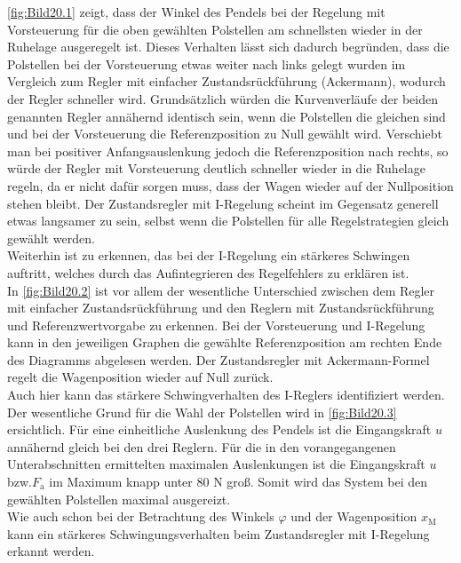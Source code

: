 \documentclass[
	pagesize,
	fontsize=12pt,
	paper=a4,
	oneside,
   reqno
]{scrartcl}
\newcommand{\bzw}{bzw.\xspace}
\begin{document}
\autoref{fig:Bild20.1} zeigt, dass der Winkel des Pendels bei der Regelung mit Vorsteuerung für die oben gewählten Polstellen am schnellsten wieder in der Ruhelage ausgeregelt ist. Dieses Verhalten lässt sich dadurch begründen, dass die Polstellen bei der Vorsteuerung etwas weiter nach links gelegt wurden im Vergleich zum Regler mit einfacher Zustandsrückführung (Ackermann), wodurch der Regler schneller wird. Grundsätzlich würden die Kurvenverläufe der beiden genannten Regler annähernd identisch sein, wenn die Polstellen die gleichen sind und bei der Vorsteuerung die Referenzposition zu Null gewählt wird. Verschiebt man bei positiver Anfangsauslenkung jedoch die Referenzposition nach rechts, so würde der Regler mit Vorsteuerung deutlich schneller wieder in die Ruhelage regeln, da er nicht dafür sorgen muss, dass der Wagen wieder auf der Nullposition stehen bleibt. Der Zustandsregler mit I-Regelung scheint im Gegensatz generell etwas langsamer zu sein, selbst wenn die Polstellen für alle Regelstrategien gleich gewählt werden. \\
Weiterhin ist zu erkennen, das bei der I-Regelung ein stärkeres Schwingen auftritt, welches durch das Aufintegrieren des Regelfehlers zu erklären ist. \\
\newline
In \autoref{fig:Bild20.2} ist vor allem der wesentliche Unterschied zwischen dem Regler mit einfacher Zustandsrückführung und den Reglern mit Zustandsrückführung und Referenzwertvorgabe zu erkennen. Bei der Vorsteuerung und I-Regelung kann in den jeweiligen Graphen die gewählte Referenzposition am rechten Ende des Diagramms abgelesen werden. Der Zustandsregler mit Ackermann-Formel regelt die Wagenposition wieder auf Null zurück. \\
Auch hier kann das stärkere Schwingverhalten des I-Reglers identifiziert werden. \\
\newline
Der wesentliche Grund für die Wahl der Polstellen wird in \autoref{fig:Bild20.3} ersichtlich. Für eine einheitliche Auslenkung des Pendels ist die Eingangskraft $u$ annähernd gleich bei den drei Reglern. Für die in den vorangegangenen Unterabschnitten ermittelten maximalen Auslenkungen ist die Eingangskraft $u$ \bzw $F_{\mathrm{a}}$ im Maximum knapp unter 80 N groß. Somit wird das System bei den gewählten Polstellen maximal ausgereizt. \\
Wie auch schon bei der Betrachtung des Winkels $\varphi$ und der Wagenposition $x_{\mathrm{M}}$ kann ein stärkeres Schwingungsverhalten beim Zustandsregler mit I-Regelung erkannt werden.
\end{document}
